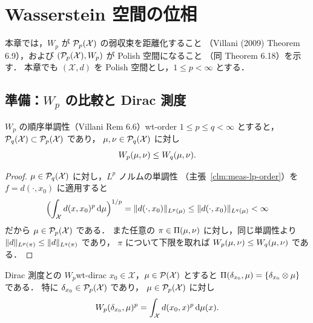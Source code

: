 \chapter{Wasserstein 空間の位相}
\label{ch:topology}

本章では，$W_p$ が $\mathcal{P}_{p}(\mathcal{X})$ の弱収束を距離化すること
（Villani (2009) Theorem 6.9），および
$(\mathcal{P}_{p}(\mathcal{X}),W_p)$ が Polish 空間になること
（同 Theorem 6.18）を示す．
本章でも $(\mathcal{X},d)$ を Polish 空間とし，$1\leq p<\infty$ とする．

\section{準備：$W_p$ の比較と Dirac 測度}
\label{sec:wt-preliminaries}

\begin{lemma}{$W_p$ の順序単調性（Villani Rem 6.6）}{wt-order}
  $1\leq p\leq q<\infty$ とすると，
  $\mathcal{P}_{q}(\mathcal{X})\subset\mathcal{P}_{p}(\mathcal{X})$ であり，
  $\mu,\nu\in\mathcal{P}_{q}(\mathcal{X})$ に対し
  \[
    W_p(\mu,\nu)\leq W_q(\mu,\nu).
  \]
\end{lemma}

\begin{proof}
  $\mu\in\mathcal{P}_{q}(\mathcal{X})$ に対し，$L^p$ ノルムの単調性
  （主張~\ref{clm:meas-lp-order}）を $f=d(\cdot,x_0)$ に適用すると
  \[
    \Bigl(\int_{\mathcal{X}}d(x,x_0)^p\,\mathrm{d}\mu\Bigr)^{1/p}
    =\lVert d(\cdot,x_0) \rVert_{L^p(\mu)}
    \leq\lVert d(\cdot,x_0) \rVert_{L^q(\mu)}<\infty
  \]
  だから $\mu\in\mathcal{P}_{p}(\mathcal{X})$ である．
  また任意の $\pi\in\Pi(\mu,\nu)$ に対し，同じ単調性より
  $\lVert d \rVert_{L^p(\pi)}\leq\lVert d \rVert_{L^q(\pi)}$ であり，
  $\pi$ について下限を取れば
  $W_p(\mu,\nu)\leq W_q(\mu,\nu)$ である．
\end{proof}

\begin{lemma}{Dirac 測度との $W_p$}{wt-dirac}
  $x_0\in\mathcal{X}$，$\mu\in\mathcal{P}(\mathcal{X})$ とすると
  $\Pi(\delta_{x_0},\mu)=\{\delta_{x_0}\otimes\mu\}$ である．
  特に $\delta_{x_0}\in\mathcal{P}_{p}(\mathcal{X})$ であり，
  $\mu\in\mathcal{P}_{p}(\mathcal{X})$ に対し
  \[
    W_p(\delta_{x_0},\mu)^p
    =\int_{\mathcal{X}}d(x_0,x)^p\,\mathrm{d}\mu(x).
  \]
\end{lemma}

